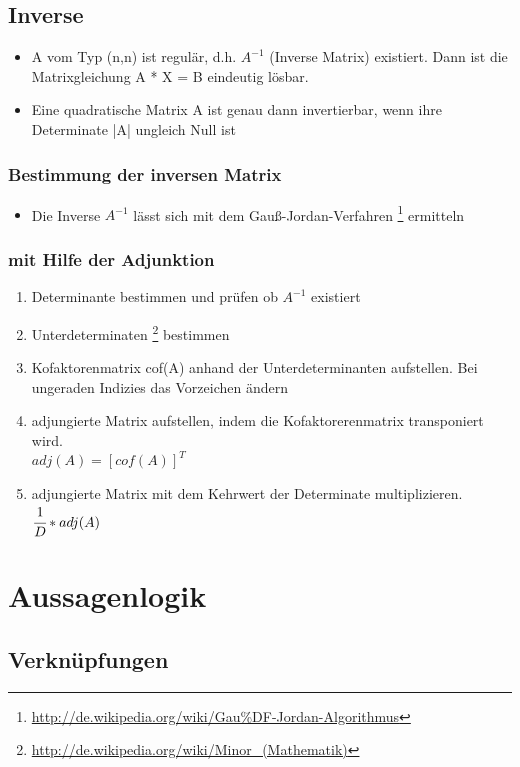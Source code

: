 \documentclass[a4paper,12pt]{scrartcl}
\begin{document}
\subsection{Inverse}
\begin{itemize}
\item A vom Typ (n,n) ist regulär, d.h. $A^{-1}$ (Inverse Matrix) existiert. Dann ist die Matrixgleichung A * X = B eindeutig lösbar.
\item Eine quadratische Matrix A ist genau dann invertierbar, wenn ihre Determinate |A| ungleich Null ist
\end{itemize}

\subsubsection{Bestimmung der inversen Matrix}
\begin{itemize}
\item Die Inverse $A^{-1}$ lässt sich mit dem Gauß-Jordan-Verfahren \footnote{\url{http://de.wikipedia.org/wiki/Gau\%DF-Jordan-Algorithmus}} ermitteln
\end{itemize}

\subsubsection{mit Hilfe der Adjunktion}
\begin{enumerate}
\item Determinante bestimmen und prüfen ob  $A^{-1}$ existiert
\item Unterdeterminaten \footnote{\url{http://de.wikipedia.org/wiki/Minor_(Mathematik)}} bestimmen
\item Kofaktorenmatrix cof(A) anhand der Unterdeterminanten aufstellen. Bei ungeraden Indizies das Vorzeichen ändern
\item adjungierte Matrix aufstellen, indem die Kofaktorerenmatrix transponiert wird. \\ $adj(A) = [cof(A)]^T$
\item adjungierte Matrix mit dem Kehrwert der Determinate multiplizieren. \\ $\cfrac{1}{D} * adj(A)$
\end{enumerate}

\newpage
\section{Aussagenlogik}
\subsection{Verknüpfungen}
\end{document}
